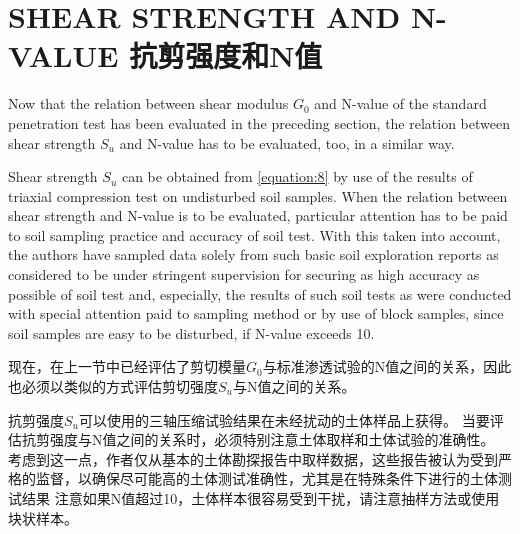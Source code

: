 \section*{SHEAR STRENGTH AND N-VALUE 抗剪强度和N值}

\begin{paracol}{2}
    
    Now that the relation between shear modulus $G_0$ and N-value of the standard penetration test has been evaluated in the preceding section, the relation between shear strength $S_u$ and N-value has to be evaluated, too, in a similar way.

    Shear strength $S_u$ can be obtained from \autoref{equation:8} by use of the results of triaxial compression test on undisturbed soil samples. When the relation between shear strength and N-value is to be evaluated, particular attention has to be paid to soil sampling practice and accuracy of soil test. With this taken into account, the authors have sampled data solely from such basic soil exploration reports as considered to be under stringent supervision for securing as high accuracy as possible of soil test and, especially, the results of such soil tests as were conducted with special attention paid to sampling method\citep{Koizumi1968} or by use of block samples, since soil samples are easy to be disturbed, if N-value exceeds 10.

    \switchcolumn

    现在，在上一节中已经评估了剪切模量$G_0$与标准渗透试验的N值之间的关系，因此也必须以类似的方式评估剪切强度$S_u$与N值之间的关系。
        
    抗剪强度$S_u$可以使用的三轴压缩试验结果在未经扰动的土体样品上获得。 当要评估抗剪强度与N值之间的关系时，必须特别注意土体取样和土体试验的准确性。 考虑到这一点，作者仅从基本的土体勘探报告中取样数据，这些报告被认为受到严格的监督，以确保尽可能高的土体测试准确性，尤其是在特殊条件下进行的土体测试结果 注意如果N值超过10，土体样本很容易受到干扰，请注意抽样方法\citep{Koizumi1968}或使用块状样本。

\end{paracol}


